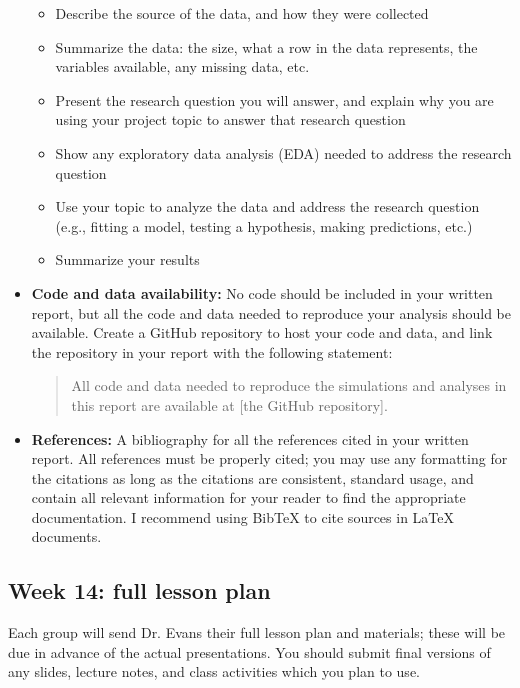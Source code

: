 \documentclass[11pt]{article}
\begin{document}
\begin{itemize}
\begin{itemize}
\item Describe the source of the data, and how they were collected
\item Summarize the data: the size, what a row in the data represents, the variables available, any missing data, etc.
\item Present the research question you will answer, and explain why you are using your project topic to answer that research question
\item Show any exploratory data analysis (EDA) needed to address the research question
\item Use your topic to analyze the data and address the research question (e.g., fitting a model, testing a hypothesis, making predictions, etc.)
\item Summarize your results
\end{itemize}

\item \textbf{Code and data availability:} No code should be included in your written report, but all the code and data needed to reproduce your analysis should be available. Create a GitHub repository to host your code and data, and link the repository in your report with the following statement:
\begin{quote}
All code and data needed to reproduce the simulations and analyses in this report are available at [the GitHub repository].
\end{quote}

\item \textbf{References:} A bibliography for all the references cited in your written report. All references must be properly cited; you may use any formatting for the citations as long as the citations are consistent, standard usage, and contain all relevant information for your reader to find the appropriate documentation. I recommend using BibTeX to cite sources in LaTeX documents.

\end{itemize}

\vspace*{0.5cm}

\subsection*{Week 14: full lesson plan}

Each group will send Dr. Evans their full lesson plan and materials; these will be due in advance of the actual presentations. You should submit final versions of any slides, lecture notes, and class activities which you plan to use.
\end{document}
